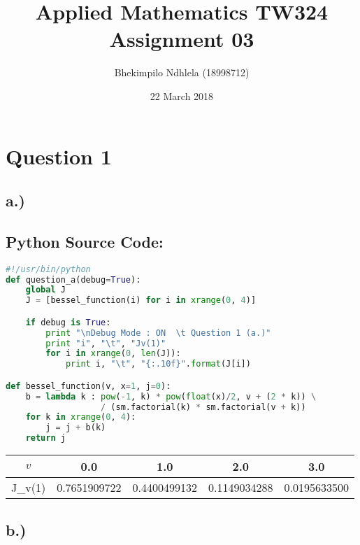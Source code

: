 \documentclass{article}
\title{Applied Mathematics TW324 Assignment 03}
\author{Bhekimpilo Ndhlela (18998712)}
\date{22 March 2018}
\begin{document}
\maketitle
\section*{Question 1}
\subsection*{a.)}
\subsection*{Python Source Code: }
\begin{lstlisting}[language=Python]
#!/usr/bin/python
def question_a(debug=True):
    global J
    J = [bessel_function(i) for i in xrange(0, 4)]

    if debug is True:
        print "\nDebug Mode : ON  \t Question 1 (a.)"
        print "i", "\t", "Jv(1)"
        for i in xrange(0, len(J)):
            print i, "\t", "{:.10f}".format(J[i])

def bessel_function(v, x=1, j=0):
    b = lambda k : pow(-1, k) * pow(float(x)/2, v + (2 * k)) \
                   / (sm.factorial(k) * sm.factorial(v + k))
    for k in xrange(0, 4):
        j = j + b(k)
    return j
\end{lstlisting}


\begin{center}
    \begin{tabular}{||c |c c c c||} 
    \hline
    $v$ & 0.0 & 1.0 & 2.0 & 3.0 \\ [0.5ex] 
    \hline\hline
    J_v(1) &  0.7651909722 & 0.4400499132 & 0.1149034288 & 0.0195633500  \\ [1ex] 
    \hline\hline 
    \end{tabular}
\end{center}
\pagebreak


\subsection*{b.)}
\end{document}
